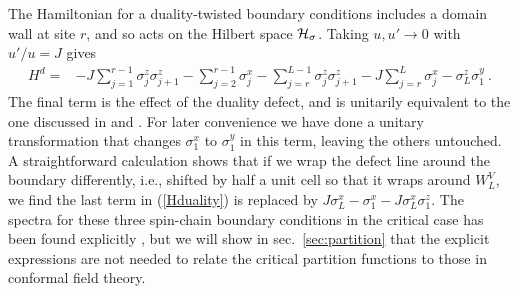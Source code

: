 \documentclass[11pt]{article}
\numberwithin{equation}{section}		%
\begin{document}




The Hamiltonian for a duality-twisted boundary conditions includes a domain wall at site $r$, and so acts on the Hilbert space ${\cal H}_\sigma$. Taking $u,u'\to 0$ with $u'/u=J$ gives 
\begin{align}
H^{d} =& - J\sum_{j=1}^{r-1}\sigma^z_j \sigma^z_{j+1} -\sum_{j =2}^{r-1}  \sigma^x_j
 -\sum_{j=r}^{L-1} \sigma^z_j \sigma^z_{j+1} - J\sum_{j=r}^{L} \sigma^x_j - \sigma_{L}^z \sigma_{1}^y\ .
\label{Hduality}
\end{align}
The final term is the effect of the duality defect, and is unitarily equivalent to the one discussed in \cite{Schutz1993} and \cite{Grimm2002}. For later convenience we have done a unitary transformation that changes $\sigma^x_1$ to $\sigma^y_1$ in this term, leaving the others untouched.
A straightforward calculation shows that if we wrap the defect line around the boundary differently, i.e., shifted by half a unit cell so that it wraps around $W_L^V$, we find the last term in (\ref{Hduality})
is replaced by $J\sigma_L^x-\sigma^x_1 -J\sigma^x_L\sigma_1^z$. 
The spectra for these three spin-chain boundary conditions in the critical case has been found explicitly \cite{Grimm2002,OBrien1996,Chui2002}, but we will show in sec.\ \ref{sec:partition} that the explicit expressions are not needed to relate the critical partition functions to those in conformal field theory.
\end{document}
